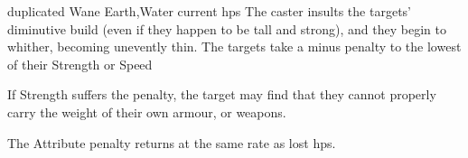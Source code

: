   {duplicated}%
  {Wane}%
  {Earth,Water}%
  {current \glspl{hp}}%
  {The caster insults the targets' diminutive build (even if they happen to be tall and strong), and they begin to whither, becoming unevently thin.
    The targets take a minus  penalty to the lowest of their Strength or Speed}%
  {If Strength suffers the penalty, the target may find that they cannot properly carry the weight of their own armour, or weapons.

    The Attribute penalty returns at the same rate as lost \glspl{hp}.}

